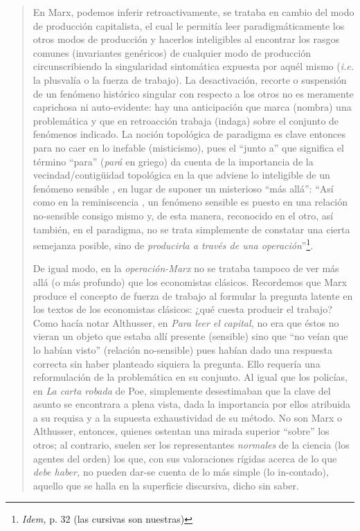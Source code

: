 \begin{quote}
En Marx, podemos inferir retroactivamente, se trataba en cambio del modo de producción capitalista, el cual le permitía leer paradigmáticamente los otros modos de producción y hacerlos inteligibles al encontrar los rasgos comunes (invariantes genéricos) de cualquier modo de producción circunscribiendo la singularidad sintomática expuesta por aquél mismo (\emph{i.e.} la plusvalía o la fuerza de trabajo). La desactivación, recorte o suspensión de un fenómeno histórico singular con respecto a los otros no es meramente caprichosa ni auto-evidente: hay una anticipación que marca (nombra) una problemática y que en retroacción trabaja (indaga) sobre el conjunto de fenómenos indicado. La noción topológica de paradigma es clave entonces para no caer en lo inefable (misticismo), pues el \enquote{junto a} que significa el término \enquote{para} (\emph{pará} en griego) da cuenta de la importancia de la vecindad/contigüidad topológica en la que adviene lo inteligible de un fenómeno sensible , en lugar de suponer un misterioso \enquote{más allá}: \enquote{Así como en la reminiscencia , un fenómeno sensible es puesto en una relación no-sensible consigo mismo y, de esta manera, reconocido en el otro, así también, en el paradigma, no se trata simplemente de constatar una cierta semejanza posible, sino de \emph{producirla a través de una operación}}\footnote{\emph{Idem,} p. 32 (las cursivas son nuestras)}.

De igual modo, en la \emph{operación-Marx} no se trataba tampoco de ver más allá (o más profundo) que los economistas clásicos. Recordemos que Marx produce el concepto de fuerza de trabajo al formular la pregunta latente en los textos de los economistas clásicos: ¿qué cuesta producir el trabajo? Como hacía notar Althusser, en \emph{Para leer el capital,} no era que éstos no vieran un objeto que estaba allí presente (sensible) sino que \enquote{no veían que lo habían visto} (relación no-sensible) pues habían dado una respuesta correcta sin haber planteado siquiera la pregunta. Ello requería una reformulación de la problemática en su conjunto. Al igual que los policías, en \emph{La carta robada} de Poe, simplemente desestimaban que la clave del asunto se encontrara a plena vista, dada la importancia por ellos atribuida a su requisa y a la supuesta exhaustividad de su método. No son Marx o Althusser, entonces, quienes ostentan una mirada superior \enquote{sobre} los otros; al contrario, suelen ser los representantes \emph{normales} de la ciencia (los agentes del orden) los que, con sus valoraciones rígidas acerca de lo que \emph{debe haber,} no pueden dar-se cuenta de lo más simple (lo in-contado), aquello que se halla en la superficie discursiva, dicho sin saber.


\end{quote}
